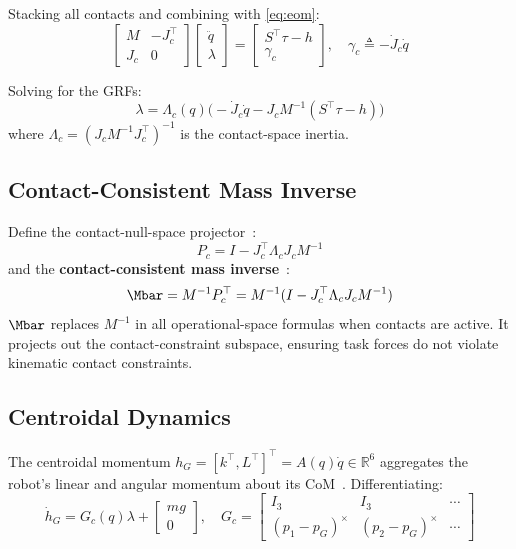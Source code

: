 Stacking all contacts and combining with \eqref{eq:eom}:
\begin{equation}\label{eq:KKT}
  \begin{bmatrix}M & -J_c^\top \\ J_c & 0\end{bmatrix}
  \begin{bmatrix}\ddot{q} \\ \lambda\end{bmatrix}
  =\begin{bmatrix}S^\top\tau-h \\ \gamma_c\end{bmatrix},
  \quad \gamma_c\triangleq-\dot{J}_c\dot{q}
\end{equation}

Solving for the GRFs:
\begin{equation}\label{eq:GRF}
  \lambda = \Lambda_c(q)\bigl(-\dot{J}_c\dot{q}-J_cM^{-1}(S^\top\tau-h)\bigr)
\end{equation}
where $\Lambda_c=(J_cM^{-1}J_c^\top)^{-1}$ is the contact-space inertia.

\subsection{Contact-Consistent Mass Inverse}

Define the contact-null-space projector~\cite{khatib1987unified,righetti2011inverse}:
\begin{equation}\label{eq:Pc}
  P_c = I - J_c^\top\Lambda_c J_c M^{-1}
\end{equation}
and the \textbf{contact-consistent mass
inverse}~\cite{khatib1987unified,righetti2011inverse}:
\begin{equation}\label{eq:Mbar}
  \Mbar = M^{-1}P_c^\top = M^{-1}(I-J_c^\top\Lambda_cJ_cM^{-1})
\end{equation}
$\Mbar$ replaces $M^{-1}$ in all operational-space formulas when contacts
are active. It projects out the contact-constraint subspace, ensuring task
forces do not violate kinematic contact constraints.

\subsection{Centroidal Dynamics}

The centroidal momentum $h_G=[k^\top,L^\top]^\top=A(q)\dot{q}\in\mathbb{R}^6$
aggregates the robot's linear and angular momentum about its
CoM~\cite{orin2013centroidal}. Differentiating:
\begin{equation}\label{eq:centroidal}
  \dot{h}_G = G_c(q)\lambda + \begin{bmatrix}mg \\ 0\end{bmatrix},
  \quad
  G_c = \begin{bmatrix}I_3 & I_3 & \cdots \\
                       (p_1{-}p_G)^\times & (p_2{-}p_G)^\times & \cdots\end{bmatrix}
\end{equation}

